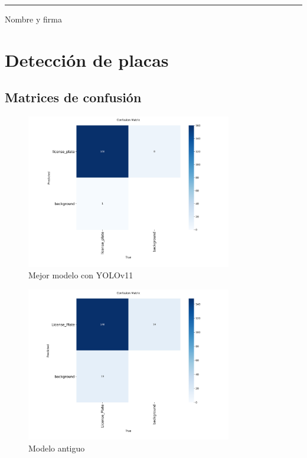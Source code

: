 \documentclass[12pt,a4paper]{article}
\begin{document}
\vspace{2cm}

\noindent\rule{8cm}{0.4pt}  
Nombre y firma

\newpage

\section{Detección de placas}

\subsection{Matrices de confusión}

\begin{figure}[H]
	\centering
	\includegraphics[width=0.8\textwidth]{../cap1/fig/proy/confusion_matrix-new-model.png}
	\caption{Mejor modelo con YOLOv11}
\end{figure}

\begin{figure}[H]
	\centering
	\includegraphics[width=0.8\textwidth]{../cap1/fig/proy/confusion_matrix-old-model.png}
	\caption{Modelo antiguo}
\end{figure}
\end{document}
